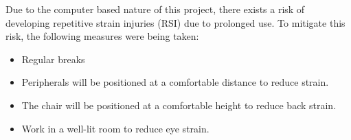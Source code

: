 \documentclass[../../main.tex]{subfiles}
\begin{document}
Due to the computer based nature of this project, there exists a risk of developing repetitive strain injuries (RSI) due to prolonged use. To mitigate this risk, the following measures were being taken:

\begin{itemize}
    \item Regular breaks 
    \item Peripherals will be positioned at a comfortable distance to reduce strain.
    \item The chair will be positioned at a comfortable height to reduce back strain.
    \item Work in a well-lit room to reduce eye strain.
    
    
\end{itemize}
\ifSubfilesClassLoaded{%
    \printbibliography{}
}{} 
\end{document}
